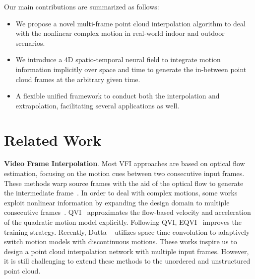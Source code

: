 \documentclass[10pt,twocolumn,letterpaper]{article}
\begin{document}
Our main contributions are summarized as follows:
\begin{itemize} 
\item We propose a novel multi-frame point cloud interpolation algorithm to deal with the nonlinear complex motion in real-world indoor and outdoor scenarios. 


\item We introduce a 4D spatio-temporal neural field to integrate motion information implicitly over space and time to generate the in-between point cloud frames at the arbitrary given time.


\item A flexible unified framework to conduct both the interpolation and extrapolation, facilitating several applications as well. 
\end{itemize}



\section{Related Work}
\label{sec: related work}



\textbf{Video Frame Interpolation}. Most VFI approaches are based on optical flow estimation, focusing on the motion cues between two consecutive input frames. These methods warp source frames with the aid of the optical flow to generate the intermediate frame~\cite{jiang2018super, bao2019depth, reda2019unsupervised, park2020bmbc}. In order to deal with complex motions, some works exploit nonlinear information by expanding the design domain to multiple consecutive frames~\cite{xu2019quadratic, liu2020enhanced, dutta2022non, chi2020all, shi2022video}. QVI~\cite{xu2019quadratic} approximates the flow-based velocity and acceleration of the quadratic motion model explicitly. Following QVI, EQVI~\cite{liu2020enhanced} improves the training strategy. Recently, Dutta \etal~\cite{dutta2022non} utilizes space-time convolution to adaptively switch motion models with discontinuous motions. These works inspire us to design a point cloud interpolation network with multiple input frames. However, it is still challenging to extend these methods to the unordered and unstructured point cloud.
\end{document}
